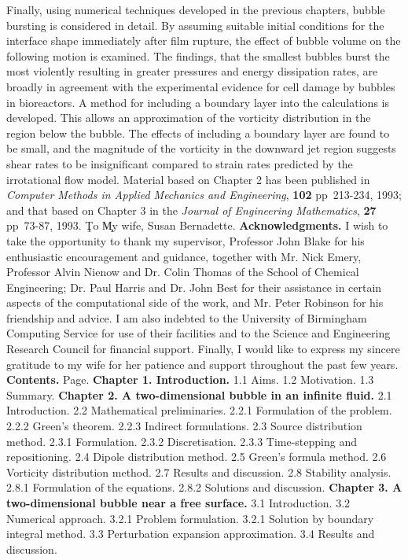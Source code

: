 Finally, using numerical techniques developed in the
previous chapters, bubble bursting is considered in detail. 
By assuming suitable initial conditions for the interface shape immediately
after film rupture, the effect of bubble volume on the following motion is
examined. The findings, that the smallest bubbles
burst the most violently resulting in greater pressures and energy 
dissipation rates, are broadly in agreement with the experimental evidence
for cell damage by bubbles in bioreactors.
A method for including a boundary layer into the calculations is
developed. This allows an approximation of the vorticity distribution
in the region below the bubble.
The effects of including a boundary layer are found to be small, and the
magnitude of the vorticity in the downward jet region suggests
shear rates to be insignificant compared to strain rates predicted by the irrotational flow model.
\vskip 10pt
Material based on Chapter 2 has been published
in {\sl Computer Methods in Applied Mechanics
and Engineering}, {\bf 102} pp~213-234, 1993;
and that based on Chapter 3 in the {\sl Journal
of Engineering Mathematics}, {\bf 27} pp~73-87, 1993.
\pg
%
\vbox{
\vskip 4in
\c {To}
\vskip 15pt
\c {My wife, Susan Bernadette.}
}
\pg
%
\vbox{
\vskip 1in
\c {\bf Acknowledgments.}
\vskip 15pt
I wish to take the opportunity to thank my supervisor, Professor
John Blake for his enthusiastic encouragement and guidance, together with 
Mr. Nick Emery, Professor Alvin Nienow
and Dr. Colin Thomas of the School of 
Chemical Engineering;
Dr. Paul Harris
and Dr. John Best for their assistance in certain aspects of
the computational side of the work, and Mr. Peter Robinson
for his friendship and advice.
\vskip 5pt
I am also indebted to the University of Birmingham Computing Service
for use of their facilities
and to the Science and Engineering Research Council for
financial support.
\vskip 5pt
Finally, I would like to express my sincere gratitude to my wife for 
her patience and support throughout the past few years.
}
\pg
%
\vbox{
\obeylines
\vskip 5pt
\c {\bf Contents.}
\vskip 5pt
\hfill Page.
\vskip 5pt
{\bf Chapter 1. Introduction.}
1.1 Aims. 
1.2 Motivation. 
1.3 Summary. 
\vskip 5pt
{\bf Chapter 2. A two-dimensional bubble in an infinite fluid.}
2.1 Introduction. 
2.2 Mathematical preliminaries.
\itemitem{} 2.2.1 Formulation of the problem. 
\itemitem{} 2.2.2 Green's theorem. 
\itemitem{} 2.2.3 Indirect formulations. 
2.3 Source distribution method.
\itemitem{} 2.3.1 Formulation. 
\itemitem{} 2.3.2 Discretisation. 
\itemitem{} 2.3.3 Time-stepping and repositioning. 
2.4 Dipole distribution method. 
2.5 Green's formula method. 
2.6 Vorticity distribution method. 
2.7 Results and discussion. 
2.8 Stability analysis.
\itemitem{} 2.8.1 Formulation of the equations. 
\itemitem{} 2.8.2 Solutions and discussion. 
\vskip 5pt
{\bf Chapter 3. A two-dimensional bubble near a free surface.}
3.1 Introduction. 
3.2 Numerical approach.
\itemitem{} 3.2.1 Problem formulation. 
\itemitem{} 3.2.1 Solution by boundary integral method. 
3.3 Perturbation expansion approximation. 
3.4 Results and discussion. 
}

